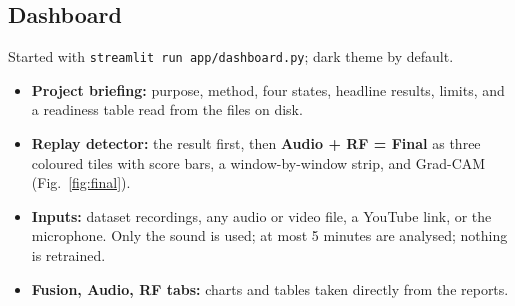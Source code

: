 \documentclass[conference,a4paper]{IEEEtran}
\begin{document}
\subsection{Dashboard}
Started with \texttt{streamlit run app/dashboard.py}; dark theme by default.
\begin{itemize}
  \item \textbf{Project briefing:} purpose, method, four states, headline results, limits, and a
        readiness table read from the files on disk.
  \item \textbf{Replay detector:} the result first, then \textbf{Audio + RF = Final} as three
        coloured tiles with score bars, a window-by-window strip, and Grad-CAM
        (Fig.~\ref{fig:final}).
  \item \textbf{Inputs:} dataset recordings, any audio or video file, a YouTube link, or the
        microphone. Only the sound is used; at most 5 minutes are analysed; nothing is retrained.
  \item \textbf{Fusion, Audio, RF tabs:} charts and tables taken directly from the reports.
\end{itemize}
\end{document}
